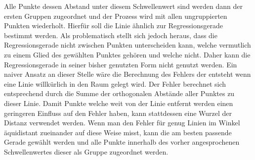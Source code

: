 Alle Punkte dessen Abstand unter diesem Schwellenwert sind werden dann der ersten Gruppen zugeordnet und der Prozess wird mit allen ungruppierten Punkten wiederholt.
Hierfür soll die Linie ähnlich zur Regressionsgerade bestimmt werden.
Als problematisch stellt sich jedoch heraus, dass die Regressionsgerade nicht zwischen Punkten unterscheiden kann, welche vermutlich zu einem Glied des gewählten Punktes gehören und welche nicht.
Daher kann die Regressionsgerade in seiner bisher genutzten Form nicht genutzt werden.
Ein naiver Ansatz an dieser Stelle wäre die Berechnung des Fehlers der entsteht wenn eine Linie willkürlich in den Raum gelegt wird.
Der Fehler berechnet sich entsprechend durch die Summe der orthogonalen Abstände aller Punktes zu dieser Linie.
Damit Punkte welche weit von der Linie entfernt werden einen geringeren Einfluss auf den Fehler haben, kann stattdessen eine Wurzel der Distanz verwendet werden.
Wenn man den Fehler für genug Linien im Winkel äquidistant zueinander auf diese Weise misst, kann die am besten passende Gerade gewählt werden und alle Punkte innerhalb des vorher angesprochenen Schwellenwertes dieser als Gruppe zugeordnet werden.

